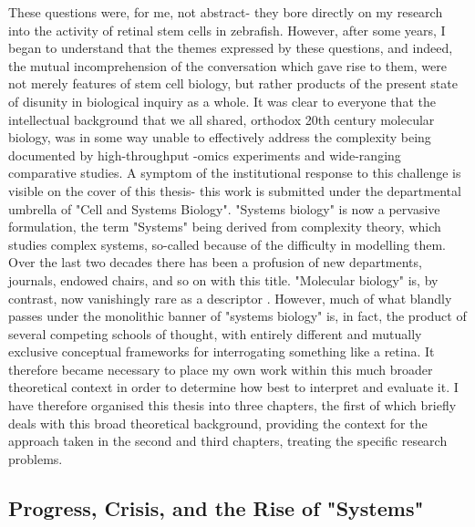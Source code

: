 These questions were, for me, not abstract- they bore directly on my research into the activity of retinal stem cells in zebrafish. However, after some years, I began to understand that the themes expressed by these questions, and indeed, the mutual incomprehension of the conversation which gave rise to them, were not merely features of stem cell biology, but rather products of the present state of disunity in biological inquiry as a whole. It was clear to everyone that the intellectual background that we all shared, orthodox 20th century molecular biology, was in some way unable to effectively address the complexity being documented by high-throughput -omics experiments and wide-ranging comparative studies. A symptom of the institutional response to this challenge is visible on the cover of this thesis- this work is submitted under the departmental umbrella of "Cell and Systems Biology". "Systems biology" is now a pervasive formulation, the term "Systems" being derived from complexity theory, which studies complex systems, so-called because of the difficulty in modelling them. Over the last two decades there has been a profusion of new departments, journals, endowed chairs, and so on with this title. "Molecular biology" is, by contrast, now vanishingly rare as a descriptor \cite{Morange2008}. However, much of what blandly passes under the monolithic banner of "systems biology" is, in fact, the product of several competing schools of thought, with entirely different and mutually exclusive conceptual frameworks for interrogating something like a retina. It therefore became necessary to place my own work within this much broader theoretical context in order to determine how best to interpret and evaluate it. I have therefore organised this thesis into three chapters, the first of which briefly deals with this broad theoretical background, providing the context for the approach taken in the second and third chapters, treating the specific research problems.

\subsection{Progress, Crisis, and the Rise of "Systems"}

